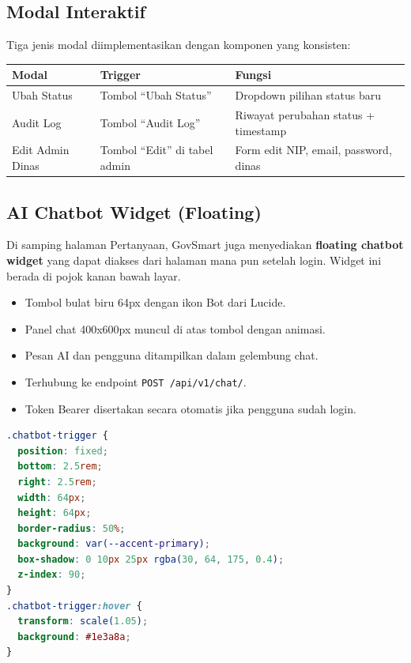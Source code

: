 \documentclass[12pt,a4paper]{article}
\begin{document}
\subsection{Modal Interaktif}

Tiga jenis modal diimplementasikan dengan komponen yang konsisten:

\begin{center}
\begin{longtable}{p{3.5cm}p{4cm}p{5cm}}
  \toprule
  \textbf{Modal} & \textbf{Trigger} & \textbf{Fungsi} \\
  \midrule
  Ubah Status & Tombol ``Ubah Status'' & Dropdown pilihan status baru \\
  Audit Log & Tombol ``Audit Log'' & Riwayat perubahan status + timestamp \\
  Edit Admin Dinas & Tombol ``Edit'' di tabel admin & Form edit NIP, email, password, dinas \\
  \bottomrule
\end{longtable}
\end{center}

\subsection{AI Chatbot Widget (Floating)}

Di samping halaman Pertanyaan, GovSmart juga menyediakan \textbf{floating chatbot widget}
yang dapat diakses dari halaman mana pun setelah login. Widget ini berada di pojok
kanan bawah layar.

\begin{itemize}[leftmargin=2em, itemsep=4pt]
  \item Tombol bulat biru 64px dengan ikon Bot dari Lucide.
  \item Panel chat 400x600px muncul di atas tombol dengan animasi.
  \item Pesan AI dan pengguna ditampilkan dalam gelembung chat.
  \item Terhubung ke endpoint \texttt{POST /api/v1/chat/}.
  \item Token Bearer disertakan secara otomatis jika pengguna sudah login.
\end{itemize}

\begin{lstlisting}[language=CSS, caption=Styling chatbot trigger button]
.chatbot-trigger {
  position: fixed;
  bottom: 2.5rem;
  right: 2.5rem;
  width: 64px;
  height: 64px;
  border-radius: 50%;
  background: var(--accent-primary);
  box-shadow: 0 10px 25px rgba(30, 64, 175, 0.4);
  z-index: 90;
}
.chatbot-trigger:hover {
  transform: scale(1.05);
  background: #1e3a8a;
}
\end{lstlisting}
\end{document}
